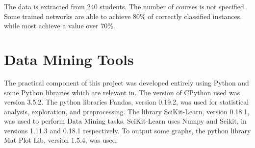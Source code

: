 The data is extracted from 240 students. The number of courses is not
specified. Some trained networks are able to achieve 80\% of correctly
classified instances, while most achieve a value over 70\%.

\section{Data Mining Tools}

The practical component of this project was developed entirely using Python and
some Python libraries which are relevant in. The version of CPython used was
version 3.5.2. The python libraries Pandas, version 0.19.2, was used for
statistical analysis, exploration, and preprocessing. The library SciKit-Learn,
version 0.18.1, was used to perform Data Mining tasks. SciKit-Learn uses Numpy
and Scikit, in versions 1.11.3 and 0.18.1 respectively. To output some graphs,
the python library Mat Plot Lib, version 1.5.4, was used.

